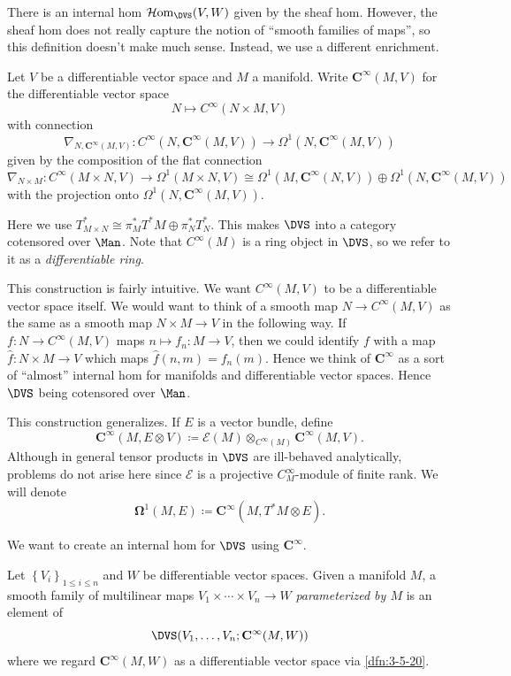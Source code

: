 There is an internal hom $\mathcal{H} \mathrm{om} _{\DVS } (V,W)$ given by the sheaf hom. However, the sheaf hom does not really capture the notion of ``smooth families of maps'', so this definition doesn't make much sense. Instead, we use a different enrichment.

\begin{definition}\label{dfn:3-5-20}
	Let $V$ be a differentiable vector space and $M$ a manifold. Write $\mathbf{C}^\infty (M,V)$ for the differentiable vector space
	\[
		N\mapsto C^\infty (N\times M,V)
	\]
	with connection
	\[
		\nabla _{N,\mathbf{C}^\infty (M,V)} : C^\infty (N,\mathbf{C} ^\infty (M,V)) \to \Omega ^1(N,\mathbf{C}^\infty (M,V))
	\]
	given by the composition of the flat connection
	\[
		\nabla_{N\times M} : C^\infty (M\times N,V) \to \Omega ^1(M\times N,V)\cong \Omega ^1(M,\mathbf{C} ^\infty (N,V))\oplus \Omega ^1(N,\mathbf{C} ^\infty (M,V))
	\]
	with the projection onto $\Omega ^1(N, \mathbf{C} ^\infty (M,V))$.
\end{definition}
Here we use $T^*_{M\times N} \cong \pi _M^*T^*M \oplus \pi _N^*T^*_N$. This makes $\DVS $ into a category cotensored over $\Man $. Note that $C^\infty (M)$ is a ring object in $\DVS $, so we refer to it as a \emph{differentiable ring}.

This construction is fairly intuitive. We want $C^\infty (M,V)$ to be a differentiable vector space itself. We would want to think of a smooth map $N\to C^\infty (M,V)$ as the same as a smooth map $N\times M\to V$ in the following way. If $f : N \to C^\infty (M,V)$ maps $n\mapsto f_n : M \to V$, then we could identify $f$ with a map $\widehat{f} : N\times M \to V$ which maps $\widehat{f} (n,m)=f_n(m)$. Hence we think of $\mathbf{C} ^\infty $ as a sort of ``almost'' internal hom for manifolds and differentiable vector spaces. Hence $\DVS $ being cotensored over $\Man $.

This construction generalizes. If $E$ is a vector bundle, define
\[
	\mathbf{C}^\infty (M, E\otimes V)\coloneqq \mathcal{E} (M)\otimes _{C^\infty(M) } \mathbf{C} ^\infty (M,V)
.\]
Although in general tensor products in $\DVS $ are ill-behaved analytically, problems do not arise here since $\mathcal{E}$ is a projective $C^\infty _M$-module of finite rank. We will denote
\[
	\boldsymbol{\Omega} ^1(M,E)\coloneqq \mathbf{C} ^\infty (M,T^*M \otimes E)
.\]

We want to create an internal hom for $\DVS $ using $\mathbf{C} ^\infty $.
\begin{definition}\label{dfn:3-5-21}
	Let $\left\{ V_i \right\} _{1\leq i\leq n} $ and $W$ be differentiable vector spaces. Given a manifold $M$, a smooth family of multilinear maps $V_1 \times \cdots \times V_n \to W$ \emph{parameterized by $M$} is an element of
	\[
		\DVS (V_1, \ldots , V_n ; \mathbf{C} ^\infty (M,W))
	\]
	where we regard $\mathbf{C} ^\infty (M,W)$ as a differentiable vector space via \cref{dfn:3-5-20}.
\end{definition}

